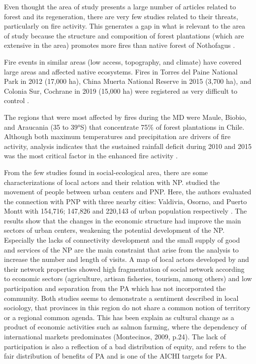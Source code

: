 \documentclass[]{article}
\begin{document}
Even thought the area of study presents a large number of articles related to forest and its regeneration, there are very few studies related to their threats, particularly on fire activity.
This generates a gap in what is relevant to the area of study because the structure and composition of forest plantations (which are extensive in the area) promotes more fires than native forest of Nothofagus \citep{Gonzalez2018Mega, McWethy2018fire}.

Fire events in similar areas (low access, topography, and climate) have covered large areas and affected native ecosystems. Fires in Torres del Paine National Park in 2012 (17,000 ha), China Muerta National Reserve in 2015 (3,700 ha), and Colonia Sur, Cochrane in 2019 (15,000 ha) were registered as very difficult to control \citep{Arroyo2019COP}.

The regions that were most affected by fires during the MD were Maule, Biobio, and Araucania (35 to 39°S) that concentrate 75\% of forest plantations in Chile. Although both maximum temperatures and precipitation are drivers of fire activity, analysis indicates that the sustained rainfall deficit during 2010 and 2015 was the most critical factor in the enhanced fire activity \citep{Gonzalez2018Mega}.

From the few studies found in social-ecological area, there are some characterizations of local actors and their relation with NP.
\citet{SozaAmigoTurism} studied the movement of people between urban centers and PNP. Here, the authors evaluated the
connection with PNP with three nearby cities: Valdivia, Osorno, and Puerto Montt with 154,716; 147,826 and 220,143 of urban population respectively \citep{Censo2017}.
The results show that the changes in the economic structure had improve the main sectors of urban centers, weakening the potential development of the NP. Especially the lacks of connectivity development and the small supply of good and services of the NP are the main constraint that arise from the analysis to increase the number and length of visits.
A map of local actors developed by \citet{mardones_social} and their network properties showed high fragmentation of social network according to economic sectors (agriculture, artisan fisheries, tourism, among others) and low participation and separation from the PA which has not incorporated the community.
Both studies seems to demonstrate a sentiment described in local sociology, that provinces in this region do not share a common notion of territory or a regional common agenda. This has been explain as cultural change as a product of economic activities such as salmon farming, where the dependency of international markets predominates (Montecinos, 2009, p.24). The lack of participation is also a reflection of a bad distribution of equity, and refers to the fair distribution of benefits of PA \citep{zafra2019progress} and is one of the AICHI targets for PA.
\end{document}
